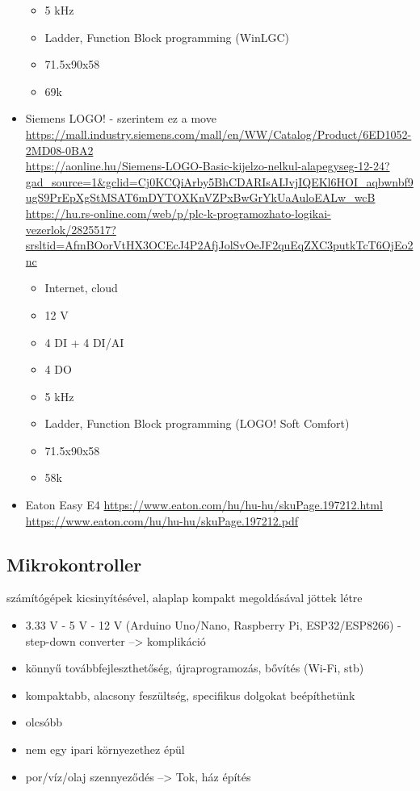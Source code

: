 \documentclass{article}
\begin{document}
\begin{itemize}
\begin{itemize}
				\item 5 kHz
				\item Ladder, Function Block programming (WinLGC)
				\item 71.5x90x58
				\item 69k
			\end{itemize}
		\item Siemens LOGO! - szerintem ez a move\\
			\url{https://mall.industry.siemens.com/mall/en/WW/Catalog/Product/6ED1052-2MD08-0BA2}\\
			\url{https://aonline.hu/Siemens-LOGO-Basic-kijelzo-nelkul-alapegyseg-12-24?gad_source=1&gclid=Cj0KCQiArby5BhCDARIsAIJvjIQEKl6HOI_aqbwnbf9ugS9PrEpXgStMSAT6mDYTOXKnVZPxBwGrYkUaAuloEALw_wcB}\\
			\url{https://hu.rs-online.com/web/p/plc-k-programozhato-logikai-vezerlok/2825517?srsltid=AfmBOorVtHX3OCEcJ4P2AfjJolSvOeJF2quEqZXC3putkTcT6OjEo2nc}\\
			\begin{itemize}
				\item Internet, cloud
				\item 12 V
				\item 4 DI + 4 DI/AI
				\item 4 DO
				\item 5 kHz
				\item Ladder, Function Block programming (LOGO! Soft Comfort)
				\item 71.5x90x58
				\item 58k
			\end{itemize}
		\item Eaton Easy E4
		\url{https://www.eaton.com/hu/hu-hu/skuPage.197212.html}
		\url{https://www.eaton.com/hu/hu-hu/skuPage.197212.pdf}
	\end{itemize}
	
	
	\subsection{Mikrokontroller}
	
	számítógépek kicsinyítésével, alaplap kompakt megoldásával jöttek létre
	
	\begin{itemize}
		\item 3.33 V - 5 V - 12 V (Arduino Uno/Nano, Raspberry Pi, ESP32/ESP8266) - step-down converter --> komplikáció
		\item könnyű továbbfejleszthetőség, újraprogramozás, bővítés (Wi-Fi, stb)
		\item kompaktabb, alacsony feszültség, specifikus dolgokat beépíthetünk
		\item olcsóbb
		\item nem egy ipari környezethez épül
		\item por/víz/olaj szennyeződés --> Tok, ház építés
	\end{itemize}
	
\end{document}
